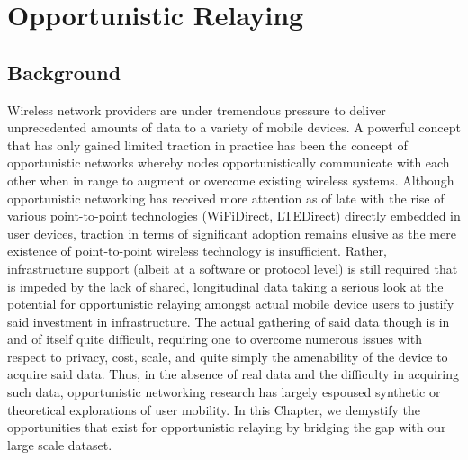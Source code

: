 \chapter{Opportunistic Relaying}
\label{chap:opp_relay}

\section{Background}
Wireless network providers are under tremendous pressure to deliver unprecedented amounts of data to a variety of mobile devices. A powerful concept that has only gained limited traction in practice has been the concept of opportunistic networks whereby nodes opportunistically communicate with each other when in range to augment or overcome existing wireless systems. Although opportunistic networking has received more attention as of late with the rise of various point-to-point technologies (WiFiDirect, LTEDirect) directly embedded in user devices, traction in terms of significant adoption remains elusive as the mere existence of point-to-point wireless technology is insufficient.  Rather, infrastructure support (albeit at a software or protocol level) is still required that is impeded by the lack of shared, longitudinal data taking a serious look at the potential for opportunistic relaying amongst actual mobile device users to justify said investment in infrastructure. The actual gathering of said data though is in and of itself quite difficult, requiring one to overcome numerous issues with respect to privacy, cost, scale, and quite simply the amenability of the device to acquire said data. Thus, in the absence of real data and the difficulty in acquiring such data, opportunistic networking research has largely espoused synthetic or theoretical explorations of user mobility.  In this Chapter, we demystify the opportunities that exist for opportunistic relaying by bridging the gap with our large scale dataset. 


